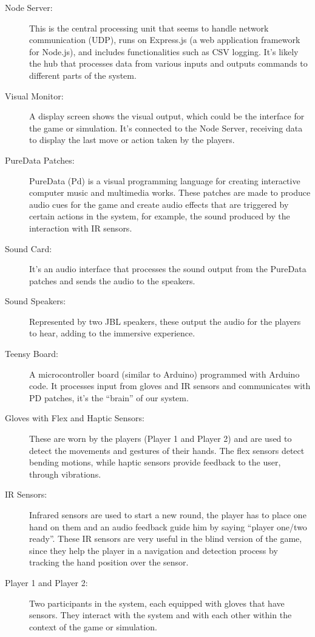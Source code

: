 \documentclass[11pt]{report}
\begin{document}
\begin{description}
  \item [Node Server:] This is the central processing unit that seems to handle network communication (UDP), runs on Express.js (a web application framework for Node.js), and includes functionalities such as CSV logging. It's likely the hub that processes data from various inputs and outputs commands to different parts of the system.
  \item [Visual Monitor:] A display screen shows the visual output, which could be the interface for the game or simulation. It's connected to the Node Server, receiving data to display the last move or action taken by the players.
  \item [PureData Patches:] PureData (Pd) is a visual programming language for creating interactive computer music and multimedia works. These patches are made to produce audio cues for the game and create audio effects that are triggered by certain actions in the system, for example, the sound produced by the interaction with IR sensors.
  \item [Sound Card:] It's an audio interface that processes the sound output from the PureData patches and sends the audio to the speakers.
  \item [Sound Speakers:] Represented by two JBL speakers, these output the audio for the players to hear, adding to the immersive experience.
  \item [Teensy Board:] A microcontroller board (similar to Arduino) programmed with Arduino code. It processes input from gloves and IR sensors and communicates with PD patches, it’s the “brain” of our system.
  \item [Gloves with Flex and Haptic Sensors:] These are worn by the players (Player 1 and Player 2) and are used to detect the movements and gestures of their hands. The flex sensors detect bending motions, while haptic sensors provide feedback to the user, through vibrations.
  \item [IR Sensors:] Infrared sensors are used to start a new round, the player has to place one hand on them and an audio feedback guide him by saying “player one/two ready”. These IR sensors are very useful in the blind version of the game, since they help the player in a navigation and detection process by tracking the hand position over the sensor.
  \item [Player 1 and Player 2:] Two participants in the system, each equipped with gloves that have sensors. They interact with the system and with each other within the context of the game or simulation.
\end{description}
\end{document}
